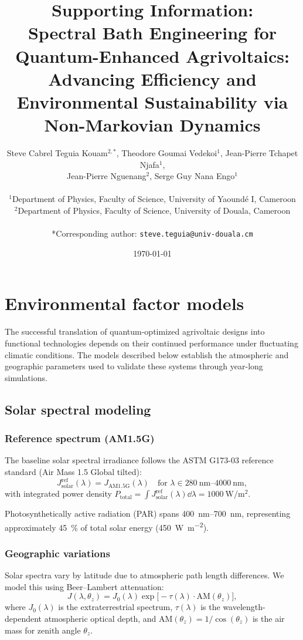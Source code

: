 \documentclass[11pt,a4paper]{article}
\title{Supporting Information:\\
Spectral Bath Engineering for Quantum-Enhanced Agrivoltaics:\\
Advancing Efficiency and Environmental Sustainability via Non-Markovian Dynamics}
\author{Steve Cabrel Teguia Kouam$^{2,*}$, Theodore Goumai Vedekoi$^{1}$, Jean-Pierre Tchapet Njafa$^{1}$,\\
Jean-Pierre Nguenang$^{2}$, Serge Guy Nana Engo$^{1}$\\
\\
$^{1}$Department of Physics, Faculty of Science, University of Yaound\'e I, Cameroon\\
$^{2}$Department of Physics, Faculty of Science, University of Douala, Cameroon\\
\\
*Corresponding author: \texttt{steve.teguia@univ-douala.cm}}
\date{\today}
\begin{document}
\maketitle

\tableofcontents
\newpage

\section{Environmental factor models}\label{si:environmental}

The successful translation of quantum-optimized agrivoltaic designs into functional technologies depends on their continued performance under fluctuating climatic conditions. The models described below establish the atmospheric and geographic parameters used to validate these systems through year-long simulations.

\subsection{Solar spectral modeling}

\subsubsection{Reference spectrum (AM1.5G)}

The baseline solar spectral irradiance follows the ASTM G173-03 reference standard (Air Mass 1.5 Global tilted):
\begin{equation}
J_{\mathrm{solar}}^{\mathrm{ref}}(\lambda) = J_{\mathrm{AM1.5G}}(\lambda) \quad \text{for } \lambda \in \SIrange{280}{4000}{\nano\meter},
\end{equation}
with integrated power density $P_{\mathrm{total}} = \int J_{\mathrm{solar}}^{\mathrm{ref}}(\lambda) \dd{\lambda} = \SI{1000}{\watt\per\metre\squared}$.

Photosynthetically active radiation (PAR) spans \SIrange{400}{700}{\nano\meter}, representing approximately \SI{45}{\percent} of total solar energy (\SI{450}{\watt\per\metre\squared}).

\subsubsection{Geographic variations}

Solar spectra vary by latitude due to atmospheric path length differences. We model this using Beer--Lambert attenuation:
\begin{equation}
J(\lambda, \theta_z) = J_0(\lambda) \exp\!\bigl[-\tau(\lambda) \cdot \mathrm{AM}(\theta_z)\bigr],
\end{equation}
where $J_0(\lambda)$ is the extraterrestrial spectrum, $\tau(\lambda)$ is the wavelength-dependent atmospheric optical depth, and $\mathrm{AM}(\theta_z) = 1/\cos(\theta_z)$ is the air mass for zenith angle $\theta_z$.
\end{document}

